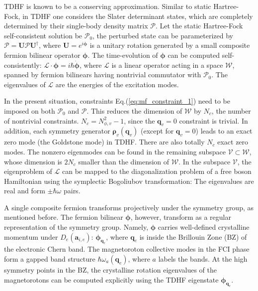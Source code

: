TDHF is known to be a conserving approximation. Similar to static Hartree-Fock, in TDHF one considers the Slater determinant states, which are completely determined by their single-body density matrix $\boldsymbol{\mathcal P}$. Let the static Hartree-Fock self-consistent solution be $\boldsymbol{\mathcal P}_0$, the perturbed state can be parameterized by $\boldsymbol{\mathcal P}=\mathbf U\boldsymbol{\mathcal P}\mathbf U^\dagger$, where $\mathbf U=e^{i\boldsymbol{\phi}}$ is a unitary rotation generated by a small composite fermion bilinear operator $\boldsymbol{\phi}$. The time-evolution of $\boldsymbol{\phi}$ can be computed self-consistently: $\boldsymbol{\mathcal L}\cdot \boldsymbol{\phi}= i\hbar \dot{\boldsymbol{\phi}}$, where $\boldsymbol{\mathcal L}$ is a linear operator acting in a space $\boldsymbol{\mathcal W}$, spanned by fermion bilinears having nontrivial commutator with $\boldsymbol{\mathcal P}_0$. The eigenvalues of $\boldsymbol{\mathcal L}$ are the energies of the excitation modes.

In the present situation, constraints Eq.(\ref{eq:mf_constraint_1}) need to be imposed on both $\boldsymbol{\mathcal P}_0$ and $\boldsymbol{\mathcal P}$. This reduces the dimension of $\boldsymbol{\mathcal W}$ by $N_c$, the number of nontrivial constraints. $N_c=N_{\phi,v}^2-1$, since the $\mathbf q_v=0$ constraint is trivial. In addition, each symmetry generator $\boldsymbol{\rho}_v(\mathbf q_v)$ (except for $\mathbf q_v=0$) leads to an exact zero mode (the Goldstone mode) in TDHF. There are also totally $N_c$ exact zero modes. The nonzero eigenmodes can be found in the remaining subspace $\boldsymbol{\mathcal V}\subset \boldsymbol{\mathcal W}$, whose dimension is $2N_c$ smaller than the dimension of $\boldsymbol{\mathcal W}$. In the subspace $\boldsymbol{\mathcal V}$, the eigenproblem of $\boldsymbol{\mathcal L}$ can be mapped to the diagonalization problem of a free boson Hamiltonian using the symplectic Bogoliubov transformation: The eigenvalues are real and form $\pm\hbar\omega$ pairs.

A single composite fermion transforms projectively under the symmetry group, as mentioned before. The fermion bilinear $\boldsymbol{\phi}$, however, transform as a regular representation of the symmetry group. Namely, $\boldsymbol{\phi}$ carries well-defined crystalline momentum under $D_e(\mathbf a_{i,e})$: $\boldsymbol{\phi}_{\mathbf q_e}$, where $\mathbf q_e$ is inside the Brillouin Zone (BZ) of the electronic Chern band. The magnetoroton collective modes in the FCI phase form a gapped band structure $\hbar\omega_a(\mathbf q_e)$, where $a$ labels the bands. At the high symmetry points in the BZ, the crystalline rotation eigenvalues of the magnetorotons can be computed explicitly using the TDHF eigenstate $\boldsymbol{\phi}_{\mathbf q_e}$. 

